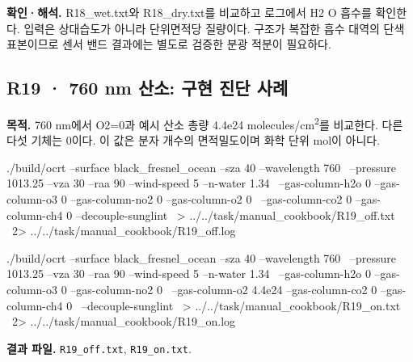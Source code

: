 \textbf{확인·해석. }R18\_wet.txt와 R18\_dry.txt를 비교하고 로그에서 H2 O 흡수를 확인한다. 입력은 상대습도가 아니라 단위면적당 질량이다. 구조가 복잡한 흡수 대역의 단색 표본이므로 센서 밴드 결과에는 별도로 검증한 분광 적분이 필요하다.


\subsection{R19 · 760 nm 산소: 구현 진단 사례}
\label{sec:auto:09_cookbook:4.4}

\label{recipe:R19}

\textbf{목적. }760 nm에서 O2=0과 예시 산소 총량 4.4e24 molecules/cm\textsuperscript{2}를 비교한다. 다른 다섯 기체는 0이다. 이 값은 분자 개수의 면적밀도이며 화학 단위 mol이 아니다.

\noindent\begin{minipage}{\linewidth}
\begin{ManualCode}

./build/ocrt --surface black_fresnel_ocean --sza 40 --wavelength 760 \
  --pressure 1013.25 --vza 30 --raa 90 --wind-speed 5 --n-water 1.34 \
  --gas-column-h2o 0 --gas-column-o3 0 --gas-column-no2 0 --gas-column-o2 0 \
  --gas-column-co2 0 --gas-column-ch4 0 --decouple-sunglint \
  > ../../task/manual_cookbook/R19_off.txt \
  2> ../../task/manual_cookbook/R19_off.log

\end{ManualCode}
\end{minipage}\par

\noindent\begin{minipage}{\linewidth}
\begin{ManualCode}

./build/ocrt --surface black_fresnel_ocean --sza 40 --wavelength 760 \
  --pressure 1013.25 --vza 30 --raa 90 --wind-speed 5 --n-water 1.34 \
  --gas-column-h2o 0 --gas-column-o3 0 --gas-column-no2 0 \
  --gas-column-o2 4.4e24 --gas-column-co2 0 --gas-column-ch4 0 \
  --decouple-sunglint \
  > ../../task/manual_cookbook/R19_on.txt \
  2> ../../task/manual_cookbook/R19_on.log

\end{ManualCode}
\end{minipage}\par

\textbf{결과 파일. }\texttt{R19\_\allowbreak{}off.txt}, \texttt{R19\_\allowbreak{}on.txt}.

